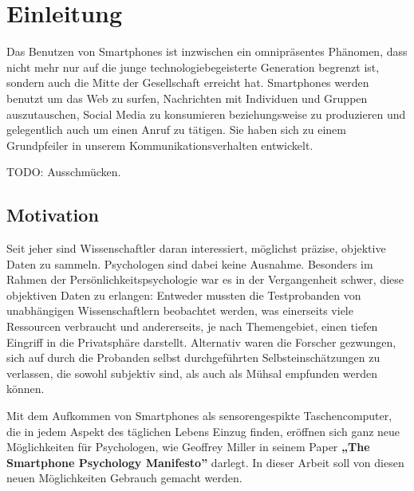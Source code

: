 
\chapter{Einleitung}
\label{ch:Einleitung}

Das Benutzen von Smartphones ist inzwischen ein omnipräsentes Phänomen,
dass nicht mehr nur auf die junge technologiebegeisterte Generation begrenzt ist,
sondern auch die Mitte der Gesellschaft erreicht hat\cite{smartphonealter}.
Smartphones werden benutzt um das Web zu surfen, Nachrichten mit Individuen und Gruppen auszutauschen, Social Media zu konsumieren beziehungsweise zu produzieren und gelegentlich auch um einen Anruf zu tätigen.
Sie haben sich zu einem Grundpfeiler in unserem Kommunikationsverhalten entwickelt.

\par

TODO: Ausschmücken.


\section{Motivation}

Seit jeher sind Wissenschaftler daran interessiert, möglichst präzise, objektive Daten zu sammeln.
Psychologen sind dabei keine Ausnahme.
Besonders im Rahmen der Persönlichkeitspsychologie war es in der Vergangenheit schwer, diese objektiven Daten zu erlangen:
Entweder mussten die Testprobanden von unabhängigen Wissenschaftlern beobachtet werden,
was einerseits viele Ressourcen verbraucht und andererseits, je nach Themengebiet,
einen tiefen Eingriff in die Privatsphäre darstellt. Alternativ waren die Forscher gezwungen,
sich auf durch die Probanden selbst durchgeführten Selbsteinschätzungen zu verlassen,
die sowohl subjektiv sind, als auch als Mühsal empfunden werden können.\par

Mit dem Aufkommen von Smartphones als sensorengespikte Taschencomputer, die in jedem Aspekt des täglichen Lebens Einzug finden,
eröffnen sich ganz neue Möglichkeiten für Psychologen, wie Geoffrey Miller in seinem Paper \textbf{„The Smartphone Psychology Manifesto”} \cite{miller2012smartphone}
darlegt. In dieser Arbeit soll von diesen neuen Möglichkeiten Gebrauch gemacht werden.\par





